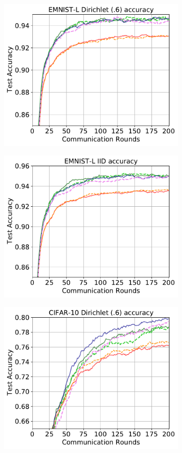 \documentclass{article} %
\begin{document}
\begin{figure}[ht!]
\begin{subfigure}{.5\textwidth}
  \includegraphics[width=.8\linewidth]{textfigure/emnist_0.6.pdf}
  \label{fig:sub1-third}
\end{subfigure}
\begin{subfigure}{.5\textwidth}
  \centering
  \includegraphics[width=.8\linewidth]{textfigure/emnist_iid.pdf}
  \label{fig:sub1-fourth}
\end{subfigure}
\begin{subfigure}{.5\textwidth}
  \centering
  \includegraphics[width=.8\linewidth]{textfigure/cifar10_0.6.pdf}

\end{subfigure}
\end{figure}
\end{document}
